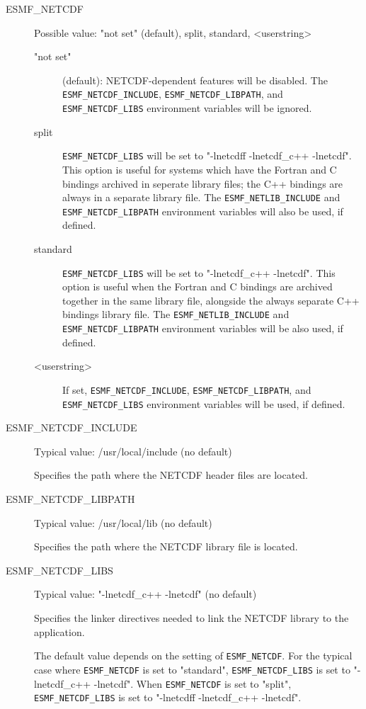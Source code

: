 \begin{description}

\item[ESMF\_NETCDF] Possible value: "not set" (default), split, standard, <userstring>

\begin{description}
\item["not set"] (default): NETCDF-dependent features will be disabled.
The {\tt ESMF\_NETCDF\_INCLUDE}, {\tt ESMF\_NETCDF\_LIBPATH}, and
{\tt ESMF\_NETCDF\_LIBS} environment variables will be ignored.

\item[split] {\tt ESMF\_NETCDF\_LIBS} will be set to "-lnetcdff -lnetcdf\_c++ -lnetcdf".  This option
is useful for systems which have the Fortran and C bindings archived in seperate
library files; 
the C++ bindings are always in a separate library file.  The {\tt ESMF\_NETLIB\_INCLUDE} and {\tt ESMF\_NETCDF\_LIBPATH}
environment variables will also be used, if defined.

\item[standard] {\tt ESMF\_NETCDF\_LIBS} will be set to "-lnetcdf\_c++ -lnetcdf".  This option
is useful when the Fortran and C bindings are archived together in the same
library file, 
alongside the always separate C++ bindings library file. 
The {\tt ESMF\_NETLIB\_INCLUDE} and {\tt ESMF\_NETCDF\_LIBPATH}
environment variables will be also used, if defined.

\item[<userstring>] If set, {\tt ESMF\_NETCDF\_INCLUDE}, {\tt ESMF\_NETCDF\_LIBPATH},
and {\tt ESMF\_NETCDF\_LIBS} environment variables will be used, if defined.
\end{description}

\item[ESMF\_NETCDF\_INCLUDE] Typical value: /usr/local/include (no default)

Specifies the path where the NETCDF header files are located.

\item[ESMF\_NETCDF\_LIBPATH] Typical value: /usr/local/lib (no default)

Specifies the path where the NETCDF library file is located.

\item[ESMF\_NETCDF\_LIBS] Typical value: "-lnetcdf\_c++ -lnetcdf" (no default)

Specifies the linker directives needed to link the NETCDF library to
the application.

The default value depends on the setting of {\tt ESMF\_NETCDF}.  For the
typical case where {\tt ESMF\_NETCDF} is set to "standard", {\tt ESMF\_NETCDF\_LIBS}
is set to "-lnetcdf\_c++ -lnetcdf".  When {\tt ESMF\_NETCDF} is set to "split",
{\tt ESMF\_NETCDF\_LIBS} is set to "-lnetcdff -lnetcdf\_c++ -lnetcdf".
\end{description}

